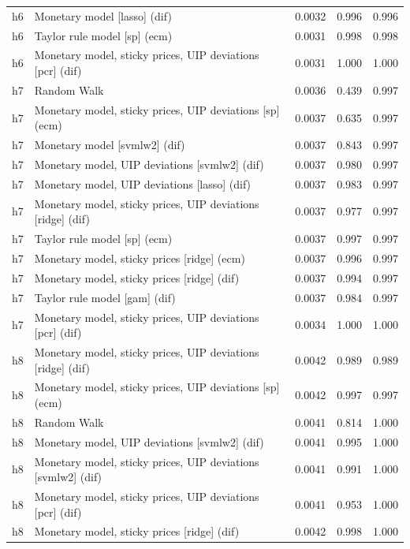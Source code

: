 \begin{ThreePartTable}
\begin{longtable}[t]{cp{5.5cm}ccc}
h6 & \raggedright Monetary model [lasso] (dif) & 0.0032 & 0.996 & 0.996\\
h6 & \raggedright Taylor rule model [sp] (ecm) & 0.0031 & 0.998 & 0.998\\
h6 & \raggedright Monetary model, sticky prices, UIP deviations [pcr] (dif) & 0.0031 & 1.000 & 1.000\\
\addlinespace
h7 & \raggedright Random Walk & 0.0036 & 0.439 & 0.997\\
h7 & \raggedright Monetary model, sticky prices, UIP deviations [sp] (ecm) & 0.0037 & 0.635 & 0.997\\
h7 & \raggedright Monetary model [svmlw2] (dif) & 0.0037 & 0.843 & 0.997\\
h7 & \raggedright Monetary model, UIP deviations [svmlw2] (dif) & 0.0037 & 0.980 & 0.997\\
h7 & \raggedright Monetary model, UIP deviations [lasso] (dif) & 0.0037 & 0.983 & 0.997\\
h7 & \raggedright Monetary model, sticky prices, UIP deviations [ridge] (dif) & 0.0037 & 0.977 & 0.997\\
h7 & \raggedright Taylor rule model [sp] (ecm) & 0.0037 & 0.997 & 0.997\\
h7 & \raggedright Monetary model, sticky prices [ridge] (ecm) & 0.0037 & 0.996 & 0.997\\
h7 & \raggedright Monetary model, sticky prices [ridge] (dif) & 0.0037 & 0.994 & 0.997\\
h7 & \raggedright Taylor rule model [gam] (dif) & 0.0037 & 0.984 & 0.997\\
h7 & \raggedright Monetary model, sticky prices, UIP deviations [pcr] (dif) & 0.0034 & 1.000 & 1.000\\
\addlinespace
h8 & \raggedright Monetary model, sticky prices, UIP deviations [ridge] (dif) & 0.0042 & 0.989 & 0.989\\
h8 & \raggedright Monetary model, sticky prices, UIP deviations [sp] (ecm) & 0.0042 & 0.997 & 0.997\\
h8 & \raggedright Random Walk & 0.0041 & 0.814 & 1.000\\
h8 & \raggedright Monetary model, UIP deviations [svmlw2] (dif) & 0.0041 & 0.995 & 1.000\\
h8 & \raggedright Monetary model, sticky prices, UIP deviations [svmlw2] (dif) & 0.0041 & 0.991 & 1.000\\
h8 & \raggedright Monetary model, sticky prices, UIP deviations [pcr] (dif) & 0.0041 & 0.953 & 1.000\\
h8 & \raggedright Monetary model, sticky prices [ridge] (dif) & 0.0042 & 0.998 & 1.000\\

\end{longtable}
\end{ThreePartTable}
